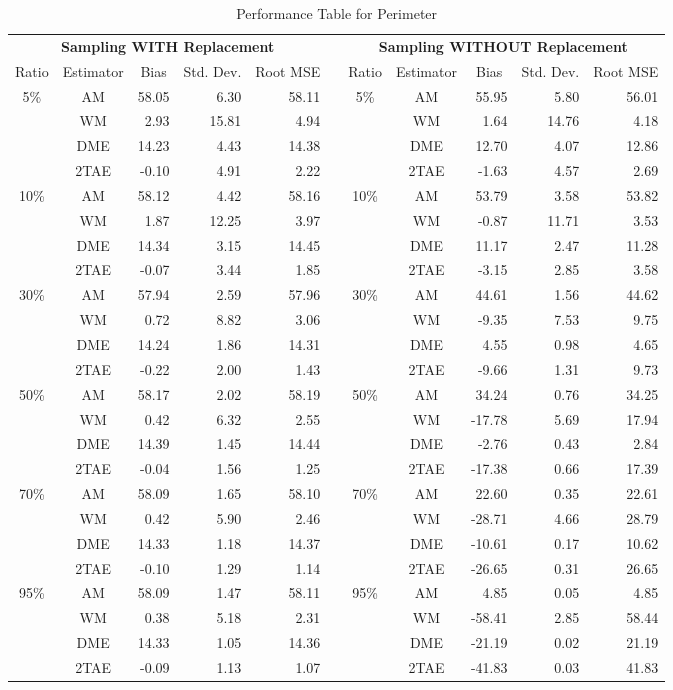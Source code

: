 \documentclass{article}\usepackage[]{graphicx}\usepackage[]{color}
\numberwithin{figure}{subsection} %
\numberwithin{table}{subsection} %
\begin{document}
\begin{table}[!tbp]
{\footnotesize
\begin{center}
\begin{tabular}{ccrrrcccrrr}
\hline\hline
\multicolumn{5}{c}{\bfseries Sampling WITH Replacement}&\multicolumn{1}{c}{\bfseries }&\multicolumn{5}{c}{\bfseries Sampling WITHOUT Replacement}\tabularnewline
\cline{1-11}
\multicolumn{1}{c}{Ratio}&\multicolumn{1}{c}{Estimator}&\multicolumn{1}{c}{Bias}&\multicolumn{1}{c}{Std. Dev.}&\multicolumn{1}{c}{Root MSE}&\multicolumn{1}{c}{}&\multicolumn{1}{c}{Ratio}&\multicolumn{1}{c}{Estimator}&\multicolumn{1}{c}{Bias}&\multicolumn{1}{c}{Std. Dev.}&\multicolumn{1}{c}{Root MSE}\tabularnewline
\hline
5\%&AM&58.05&6.30&58.11&&5\%&AM&55.95&5.80&56.01\tabularnewline
&WM&2.93&15.81&4.94&&&WM&1.64&14.76&4.18\tabularnewline
&DME&14.23&4.43&14.38&&&DME&12.70&4.07&12.86\tabularnewline
&2TAE&-0.10&4.91&2.22&&&2TAE&-1.63&4.57&2.69\tabularnewline
10\%&AM&58.12&4.42&58.16&&10\%&AM&53.79&3.58&53.82\tabularnewline
&WM&1.87&12.25&3.97&&&WM&-0.87&11.71&3.53\tabularnewline
&DME&14.34&3.15&14.45&&&DME&11.17&2.47&11.28\tabularnewline
&2TAE&-0.07&3.44&1.85&&&2TAE&-3.15&2.85&3.58\tabularnewline
30\%&AM&57.94&2.59&57.96&&30\%&AM&44.61&1.56&44.62\tabularnewline
&WM&0.72&8.82&3.06&&&WM&-9.35&7.53&9.75\tabularnewline
&DME&14.24&1.86&14.31&&&DME&4.55&0.98&4.65\tabularnewline
&2TAE&-0.22&2.00&1.43&&&2TAE&-9.66&1.31&9.73\tabularnewline
50\%&AM&58.17&2.02&58.19&&50\%&AM&34.24&0.76&34.25\tabularnewline
&WM&0.42&6.32&2.55&&&WM&-17.78&5.69&17.94\tabularnewline
&DME&14.39&1.45&14.44&&&DME&-2.76&0.43&2.84\tabularnewline
&2TAE&-0.04&1.56&1.25&&&2TAE&-17.38&0.66&17.39\tabularnewline
70\%&AM&58.09&1.65&58.10&&70\%&AM&22.60&0.35&22.61\tabularnewline
&WM&0.42&5.90&2.46&&&WM&-28.71&4.66&28.79\tabularnewline
&DME&14.33&1.18&14.37&&&DME&-10.61&0.17&10.62\tabularnewline
&2TAE&-0.10&1.29&1.14&&&2TAE&-26.65&0.31&26.65\tabularnewline
95\%&AM&58.09&1.47&58.11&&95\%&AM&4.85&0.05&4.85\tabularnewline
&WM&0.38&5.18&2.31&&&WM&-58.41&2.85&58.44\tabularnewline
&DME&14.33&1.05&14.36&&&DME&-21.19&0.02&21.19\tabularnewline
&2TAE&-0.09&1.13&1.07&&&2TAE&-41.83&0.03&41.83\tabularnewline
\hline
\end{tabular}
\caption{Performance Table for Perimeter\label{tab_per_est}}\end{center}}
\end{table}

  
\end{document}
